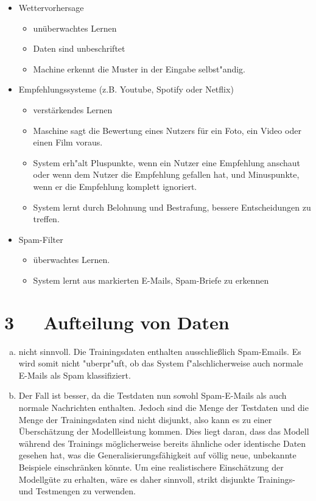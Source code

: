 \documentclass[10pt, oneside]{article}
\begin{document}
\begin{itemize}
    \item Wettervorhersage
        \begin{itemize}
            \item unüberwachtes Lernen
            \item Daten sind unbeschriftet
            \item Machine erkennt die Muster in der Eingabe selbst"andig.
        \end{itemize}

    \item Empfehlungssysteme (z.B. Youtube, Spotify oder Netflix)
        \begin{itemize}
            \item verstärkendes Lernen
            \item Maschine sagt die Bewertung eines Nutzers für ein Foto, ein
                Video oder einen Film voraus.
            \item System erh"alt Pluspunkte, wenn ein Nutzer eine Empfehlung
                anschaut oder wenn dem Nutzer die Empfehlung gefallen hat, und
                Minuspunkte, wenn er die Empfehlung komplett ignoriert.
            \item System lernt durch Belohnung und Bestrafung, bessere
                Entscheidungen zu treffen.
        \end{itemize}

    \item Spam-Filter
        \begin{itemize}
            \item überwachtes Lernen.
            \item System lernt aus markierten E-Mails, Spam-Briefe zu erkennen
        \end{itemize}
\end{itemize}

\section{3\ \ \ Aufteilung von Daten}

\begin{enumerate}[(a)]
    \item nicht sinnvoll. Die Trainingsdaten enthalten ausschlie{\ss}lich
        Spam-Emails. Es wird somit nicht "uberpr"uft, ob das System
        f"alschlicherweise auch normale E-Mails als Spam klassifiziert.
    \item Der Fall ist besser, da die Testdaten nun sowohl Spam-E-Mails als
        auch normale Nachrichten enthalten. Jedoch sind die Menge der Testdaten 
        und die Menge der Trainingsdaten sind nicht disjunkt, also kann es zu
        einer Überschätzung der Modellleistung kommen. Dies liegt daran, dass
        das Modell während des Trainings möglicherweise bereits ähnliche oder
        identische Daten gesehen hat, was die Generalisierungsfähigkeit auf
        völlig neue, unbekannte Beispiele einschränken könnte. Um eine
        realistischere Einschätzung der Modellgüte zu erhalten, wäre es daher
        sinnvoll, strikt disjunkte Trainings- und Testmengen zu verwenden.
\end{enumerate}
\end{document}

